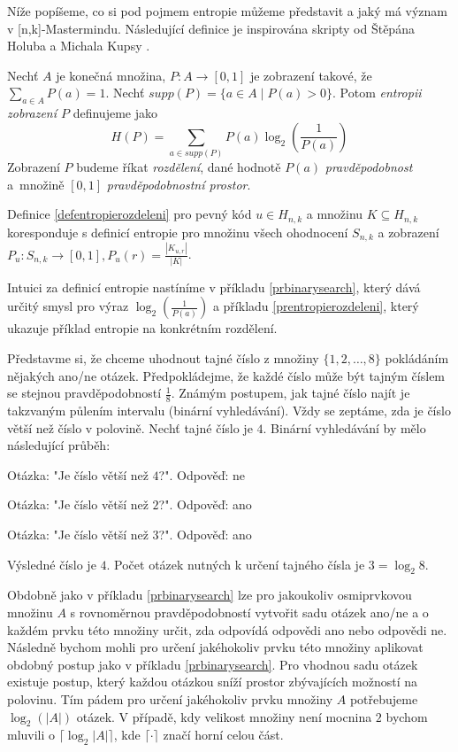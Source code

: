 Níže popíšeme, co si pod pojmem entropie můžeme představit a jaký má význam v [n,k]-Mastermindu. Následující definice je inspirována skripty od Štěpána Holuba a Michala Kupsy \cite{Holub-informace}.

\begin{definice}[Entropie]\label{defentropie}
  Nechť $A$ je konečná množina, $P \colon A \to [0,1]$ je zobrazení takové, že $\sum_{a \in A} P(a) = 1$. Nechť $supp(P) = \{ a \in A \mid P(a) > 0\}$. Potom \emph{entropii zobrazení $P$} definujeme jako 
  \[H(P) = \sum_{a \in supp(P)}P(a)\log_2\left(\frac{1}{P(a)}\right)\]
  Zobrazení $P$ budeme říkat \emph{rozdělení}, dané hodnotě $P(a)$ \emph{pravděpodobnost} a~množině $[0,1]$ \emph{pravděpodobnostní prostor}. 
\end{definice}

\begin{pozn}
    Definice \ref{defentropierozdeleni} pro pevný kód $u\in H_{n,k}$ a množinu $K \subseteq H_{n,k}$ koresponduje s definicí entropie pro množinu všech ohodnocení $S_{n,k}$ a zobrazení $P_u\colon S_{n,k} \to [0,1], P_u(r) = \frac{|K_{u,r}|}{|K|}$.
\end{pozn}

Intuici za definicí entropie nastíníme v příkladu \ref{prbinarysearch}, který dává určitý smysl pro výraz $\log_2\left(\frac{1}{P(a)}\right)$ a příkladu \ref{prentropierozdeleni}, který ukazuje příklad entropie na konkrétním rozdělení.

\begin{prikl}\label{prbinarysearch}
Představme si, že chceme uhodnout tajné číslo z množiny $\{1,2,\dots,8\}$ pokládáním nějakých ano/ne otázek. Předpokládejme, že každé číslo může být tajným číslem se stejnou pravděpodobností $\frac{1}{8}$. Známým postupem, jak tajné číslo najít je takzvaným půlením intervalu (binární vyhledávání). Vždy se zeptáme, zda je číslo větší než číslo v polovině. Nechť tajné číslo je $4$. Binární vyhledávání by mělo následující průběh:

Otázka: "Je číslo větší než $4$?". 
Odpověď: ne

Otázka: "Je číslo větší než $2$?". 
Odpověď: ano

Otázka: "Je číslo větší než $3$?". 
Odpověď: ano

Výsledné číslo je $4$. Počet otázek nutných k určení tajného čísla je $3 = \log_2 8$.
\end{prikl}

\begin{pozn}\label{poznotazkynamnozinu}
Obdobně jako v příkladu \ref{prbinarysearch} lze pro jakoukoliv osmiprvkovou množinu $A$ s rovnoměrnou pravděpodobností vytvořit sadu otázek ano/ne a o každém prvku této množiny určit, zda odpovídá odpovědi ano nebo odpovědi ne. Následně bychom mohli pro určení jakéhokoliv prvku této množiny aplikovat obdobný postup jako v příkladu \ref{prbinarysearch}. Pro vhodnou sadu otázek existuje postup, který každou otázkou sníží prostor zbývajících možností na polovinu. Tím pádem pro určení jakéhokoliv prvku množiny $A$ potřebujeme $\log_2(|A|)$ otázek. V případě, kdy velikost množiny není mocnina $2$ bychom mluvili o $\lceil \log_2 |A| \rceil$, kde $\lceil \cdot \rceil$ značí horní celou část. 
\end{pozn}

